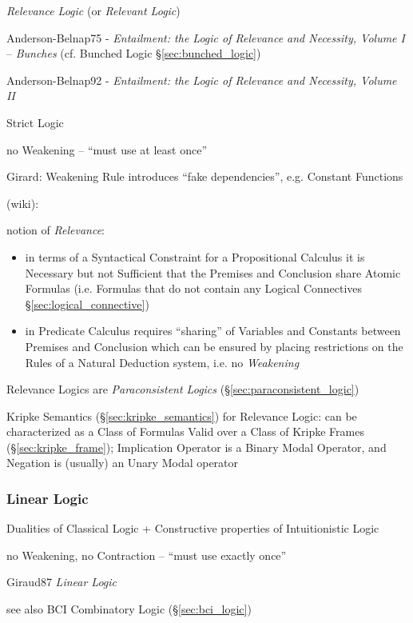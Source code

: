 \emph{Relevance Logic} (or \emph{Relevant Logic})

Anderson-Belnap75 - \emph{Entailment: the Logic of Relevance and
  Necessity, Volume I} -- \emph{Bunches} (cf. Bunched Logic
\S\ref{sec:bunched_logic})

Anderson-Belnap92 - \emph{Entailment: the Logic of Relevance and
  Necessity, Volume II}

Strict Logic

no Weakening -- ``must use at least once''

Girard: Weakening Rule introduces ``fake dependencies'', e.g. Constant
Functions

(wiki):

notion of \emph{Relevance}:
\begin{itemize}
  \item in terms of a Syntactical Constraint for a
    Propositional Calculus it is Necessary but not Sufficient that the
    Premises and Conclusion share Atomic Formulas (i.e. Formulas that do
    not contain any Logical Connectives \S\ref{sec:logical_connective})
  \item in Predicate Calculus requires ``sharing'' of Variables and
    Constants between Premises and Conclusion which can be ensured by
    placing restrictions on the Rules of a Natural Deduction system,
    i.e. no \emph{Weakening}
\end{itemize}

Relevance Logics are \emph{Paraconsistent Logics}
(\S\ref{sec:paraconsistent_logic})

Kripke Semantics (\S\ref{sec:kripke_semantics}) for Relevance Logic:
can be characterized as a Class of Formulas Valid over a Class of
Kripke Frames (\S\ref{sec:kripke_frame}); Implication Operator is a
Binary Modal Operator, and Negation is (usually) an Unary Modal
operator



\subsubsection{Linear Logic}\label{sec:linear_logic}

Dualities of Classical Logic + Constructive properties of
Intuitionistic Logic

no Weakening, no Contraction -- ``must use exactly once''

Giraud87 \emph{Linear Logic}

\fist see also BCI Combinatory Logic (\S\ref{sec:bci_logic})

